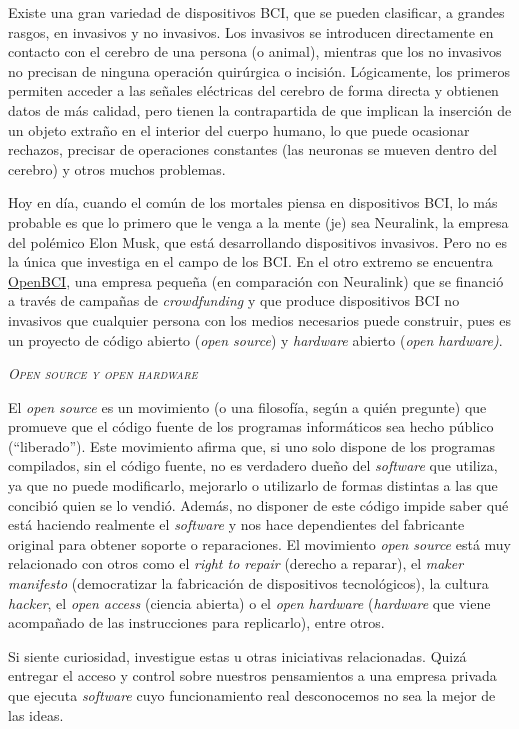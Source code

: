 \documentclass[10pt,a4paper,spanish]{article}
\newcommand{\sombreado}[2]{
  \begin{shaded}
    \begin{center} \emph{\textsc{#1}} \end{center}
    \noindent #2\\
  \end{shaded}
}
\begin{document}
Existe una gran variedad de dispositivos BCI, que se pueden clasificar, a grandes rasgos, en invasivos y no invasivos. Los invasivos se introducen directamente en contacto con el cerebro de una persona (o animal), mientras que los no invasivos no precisan de ninguna operación quirúrgica o incisión. Lógicamente, los primeros permiten acceder a las señales eléctricas del cerebro de forma directa y obtienen datos de más calidad, pero tienen la contrapartida de que implican la inserción de un objeto extraño en el interior del cuerpo humano, lo que puede ocasionar rechazos, precisar de operaciones constantes (las neuronas se mueven dentro del cerebro) y otros muchos problemas.

Hoy en día, cuando el común de los mortales piensa en dispositivos BCI, lo más probable es que lo primero que le venga a la mente (je) sea Neuralink, la empresa del polémico Elon Musk, que está desarrollando dispositivos invasivos. Pero no es la única que investiga en el campo de los BCI. En el otro extremo se encuentra \href{https://openbci.com/}{OpenBCI}, una empresa pequeña (en comparación con Neuralink) que se financió a través de campañas de \textit{crowdfunding} y que produce dispositivos BCI no invasivos que cualquier persona con los medios necesarios puede construir, pues es un proyecto de código abierto (\textit{open source}) y \textit{hardware} abierto (\textit{open hardware)}.

\sombreado{\textit{Open source} y \textit{open hardware}}{El \textit{open source} es un movimiento (o una filosofía, según a quién pregunte) que promueve que el código fuente de los programas informáticos sea hecho público (``liberado''). Este movimiento afirma que, si uno solo dispone de los programas compilados, sin el código fuente, no es verdadero dueño del \textit{software} que utiliza, ya que no puede modificarlo, mejorarlo o utilizarlo de formas distintas a las que concibió quien se lo vendió. Además, no disponer de este código impide saber qué está haciendo realmente el \textit{software} y nos hace dependientes del fabricante original para obtener soporte o reparaciones. El movimiento \textit{open source} está muy relacionado con otros como el \textit{right to repair} (derecho a reparar), el \textit{maker manifesto} (democratizar la fabricación de dispositivos tecnológicos), la cultura \textit{hacker}, el \textit{open access} (ciencia abierta) o el \textit{open hardware} (\textit{hardware} que viene acompañado de las instrucciones para replicarlo), entre otros.

Si siente curiosidad, investigue estas u otras iniciativas relacionadas. Quizá entregar el acceso y control sobre nuestros pensamientos a una empresa privada que ejecuta \textit{software} cuyo funcionamiento real desconocemos no sea la mejor de las ideas.}
\end{document}
